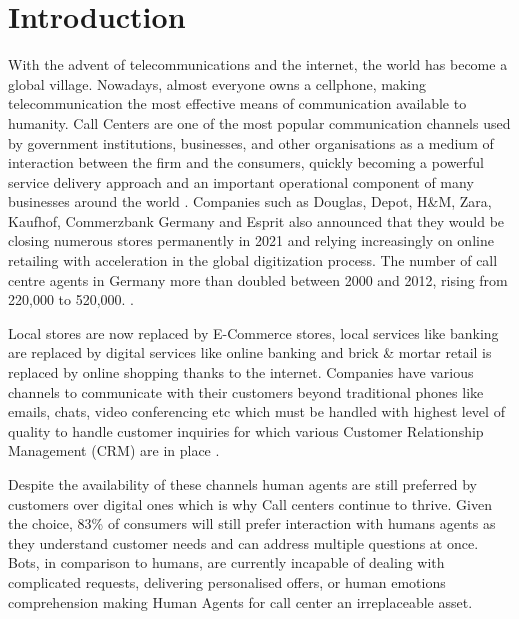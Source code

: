 \documentclass[a4paper, 11pt]{article}
\begin{document}
\section{Introduction}
With the advent of telecommunications and the internet, the world has become a global village. Nowadays, almost everyone owns a cellphone, making telecommunication the most effective means of communication available to humanity. Call Centers are one of the most popular communication channels used by government institutions, businesses, and other organisations as a medium of interaction between the firm and the consumers, quickly becoming a powerful service delivery  approach and an important operational component of many businesses around the world \cite{chuchual_inbound_2010}. Companies such as Douglas, Depot, H\&M, Zara, Kaufhof, Commerzbank Germany \cite{commerzbank_commerzbank_2021} and Esprit also announced that they would be closing numerous stores permanently in 2021 and relying increasingly on online retailing with acceleration in the global digitization process. The number of call centre agents in Germany more than doubled between 2000 and 2012, rising from 220,000 to 520,000. \cite{herzog_callcenter_2017}. 


Local stores are now replaced by E-Commerce stores, local services like banking are replaced by digital services like online banking and brick \& mortar retail is replaced by online shopping thanks to the internet. Companies have various channels to communicate with their customers beyond traditional phones like emails, chats, video conferencing etc which must be handled with highest level of quality to handle customer inquiries for which various Customer Relationship Management (CRM) are in place \cite{glas_einzelhandel_2017}. 

Despite the availability of these channels human agents are still preferred by customers over digital ones which is why Call centers continue to thrive. Given the choice, 83\% of consumers will still prefer interaction with humans agents as they understand customer needs and can address multiple questions at once. Bots, in comparison to humans, are currently incapable of dealing with complicated requests, delivering personalised offers, or human emotions comprehension \cite{forrester_human_2017} making Human Agents for call center an irreplaceable asset. 
\end{document}
